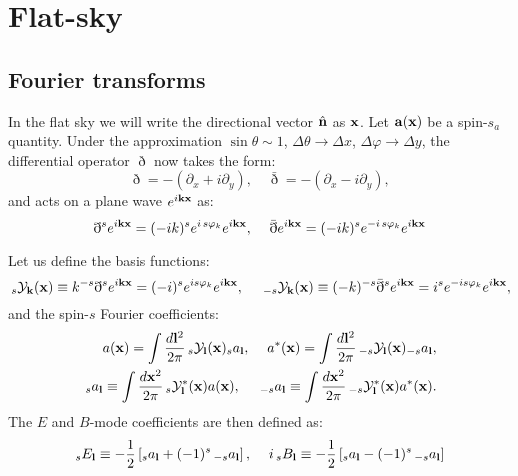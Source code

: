 \documentclass[a4paper,10pt]{article}
\newcommand{\nv}{\hat{\bf n}}
\begin{document}
\section{Flat-sky}
  \subsection{Fourier transforms}
    In the flat sky we will write the directional vector $\nv$ as ${\bf x}$. Let ${\bf a}({\bf x})$ be a spin-$s_a$ quantity. Under the approximation $\sin\theta\sim1$, $\Delta\theta\rightarrow \Delta x$, $\Delta\varphi\rightarrow\Delta y$, the differential operator $\eth$ now takes the form:
    \begin{equation}
      \eth=-(\partial_x+i\partial_y),\hspace{12pt}\bar{\eth}=-(\partial_x-i\partial_y),
    \end{equation}
    and acts on a plane wave $e^{i{\bf k}{\bf x}}$ as:
    \begin{equation}
      \eth^s e^{i{\bf k}{\bf x}}=(-ik)^se^{i\,s\varphi_k}e^{i{\bf k}{\bf x}},\hspace{12pt}
      \bar{\eth}e^{i{\bf k}{\bf x}}=(-ik)^se^{-i\,s\varphi_k}e^{i{\bf k}{\bf x}}
    \end{equation}

    Let us define the basis functions:
    \begin{equation}
      \,_s{\cal Y}_{\bf k}({\bf x})\equiv k^{-s}\eth^se^{i{\bf k}{\bf x}}=(-i)^se^{is\varphi_k}e^{i{\bf k}{\bf x}},\hspace{12pt}\,
      _{-s}{\cal Y}_{\bf k}({\bf x})\equiv (-k)^{-s}\bar{\eth}^se^{i{\bf k}{\bf x}}=i^se^{-is\varphi_k}e^{i{\bf k}{\bf x}},
    \end{equation}
    and the spin-$s$ Fourier coefficients:
    \begin{align}
      a({\bf x})  =\int\frac{d{\bf l}^2}{2\pi}\,_s{\cal Y}_{\bf l}({\bf x})_sa_{\bf l},\hspace{12pt}
      a^*({\bf x})=\int\frac{d{\bf l}^2}{2\pi}\,_{-s}{\cal Y}_{\bf l}({\bf x})_{-s}a_{\bf l},\\
      \,_sa_{\bf l}\equiv\int\frac{d{\bf x}^2}{2\pi}\,_s{\cal Y}^*_{\bf l}({\bf x})a({\bf x}),\hspace{12pt}
      \,_{-s}a_{\bf l}\equiv\int\frac{d{\bf x}^2}{2\pi}\,_{-s}{\cal Y}^*_{\bf l}({\bf x})a^*({\bf x}).
    \end{align}
    The $E$ and $B$-mode coefficients are then defined as:
    \begin{align}
      _sE_{\bf l}\equiv-\frac{1}{2}\left[_sa_{\bf l}+(-1)^s\,_{-s}a_{\bf l}\right],\hspace{12pt}
      i\,_sB_{\bf l}\equiv-\frac{1}{2}\left[_sa_{\bf l}-(-1)^s\,_{-s}a_{\bf l}\right]
    \end{align}
    
\end{document}
